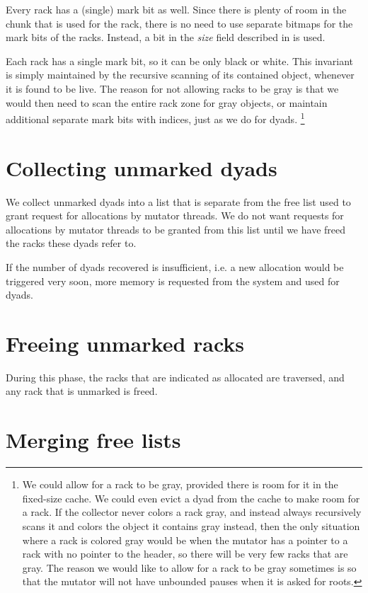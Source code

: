 Every rack has a (single) mark bit as well.  Since there is plenty of
room in the chunk that is used for the rack, there is no need to use
separate bitmaps for the mark bits of the racks.  Instead, a bit in
the \emph{size} field described in  is
used.

Each rack has a single mark bit, so it can be only black or white.
This invariant is simply maintained by the recursive scanning of its
contained object, whenever it is found to be live.  The reason for not
allowing racks to be gray is that we would then need to scan the
entire rack zone for gray objects, or maintain additional separate
mark bits with indices, just as we do for dyads.
\footnote{We could allow for a rack to be gray, provided there is room
  for it in the fixed-size cache.  We could even evict a dyad from the
  cache to make room for a rack.  If the collector never colors
  a rack gray, and instead always recursively scans it and colors the
  object it contains gray instead, then the only situation where a
  rack is colored gray would be when the mutator has a pointer to a
  rack with no pointer to the header, so there will be very few racks
  that are gray.  The reason we would like to allow for a rack to be
  gray sometimes is so that the mutator will not have unbounded pauses
  when it is asked for roots.}

\section{Collecting unmarked dyads}

We collect unmarked dyads into a list that is separate from the free
list used to grant request for allocations by mutator threads.  We do
not want requests for allocations by mutator threads to be granted
from this list until we have freed the racks these dyads refer to.

If the number of dyads recovered is insufficient, i.e. a new
allocation would be triggered very soon, more memory is requested from
the system and used for dyads.

\section{Freeing unmarked racks}

During this phase, the racks that are indicated as allocated are
traversed, and any rack that is unmarked is freed.

\section{Merging free lists}

